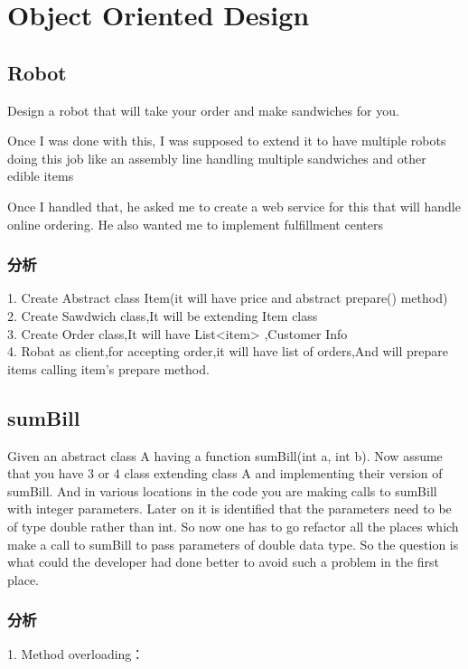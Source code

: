 \chapter{Object Oriented Design}

\section{Robot}
Design a robot that will take your order and make sandwiches for you.

Once I was done with this, I was supposed to extend it to have multiple robots doing this job like an assembly line handling multiple sandwiches and other edible items

Once I handled that, he asked me to create a web service for this that will handle online ordering. He also wanted me to implement fulfillment centers

\subsection{分析}
1. Create Abstract class Item(it will have price and abstract prepare() method) \\
2. Create Sawdwich class,It will be extending Item class \\
3. Create Order class,It will have List<item> ,Customer Info \\
4. Robat as client,for accepting order,it will have list of orders,And will prepare items calling item's prepare method.

\section{sumBill}
Given an abstract class A having a function sumBill(int a, int b). Now assume that you have 3 or 4 class extending class A and implementing their version of sumBill. And in
various locations in the code you are making calls to sumBill with integer parameters.
Later on it is identified that the parameters need to be of type double rather than int. So now one has to go refactor all the places which make a call to sumBill to pass
parameters of double data type.
So the question is what could the developer had done better to avoid such a problem in the first place.

\subsection{分析}
1. Method overloading：

